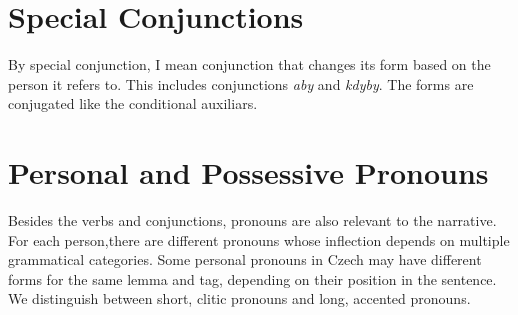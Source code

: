 \section{Special Conjunctions}

By special conjunction, I mean conjunction that changes its form based on the person it refers to. This includes conjunctions \emph{aby} and \emph{kdyby}. The forms are conjugated like the conditional auxiliars.

\section{Personal and Possessive Pronouns}

Besides the verbs and conjunctions, pronouns are also relevant to the narrative. For each person,there are different pronouns whose inflection depends on multiple grammatical categories. Some personal pronouns in Czech may have different forms for the same lemma and tag, depending on their position in the sentence. We distinguish between short, clitic pronouns and long, accented pronouns.

